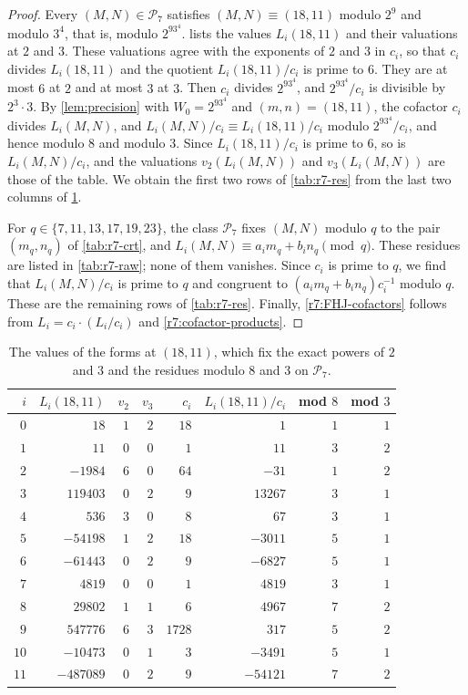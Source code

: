 \documentclass[12pt,oneside,openany]{book}
\theoremstyle{definition}
\theoremstyle{plain}
\numberwithin{equation}{chapter}
\theoremstyle{plain}
\theoremstyle{definition}
\theoremstyle{remark}
\newcommand{\cP}{\mathcal P}
\begin{document}
\begin{proof}
Every $(M,N)\in\cP_7$ satisfies $(M,N)\equiv(18,11)$ modulo $2^9$ and
modulo $3^4$, that is, modulo $2^93^4$.  lists the
values $L_i(18,11)$ and their valuations at $2$ and $3$. These valuations
agree with the exponents of $2$ and $3$ in $c_i$, so that $c_i$ divides
$L_i(18,11)$ and the quotient $L_i(18,11)/c_i$ is prime to $6$. They are at
most $6$ at $2$ and at most $3$ at $3$. Then $c_i$ divides $2^93^4$, and
$2^93^4/c_i$ is divisible by $2^3\cdot3$. By \cref{lem:precision} with
$W_0=2^93^4$ and $(m,n)=(18,11)$, the cofactor $c_i$ divides $L_i(M,N)$,
and $L_i(M,N)/c_i\equiv L_i(18,11)/c_i$ modulo $2^93^4/c_i$, and hence
modulo $8$ and modulo $3$. Since $L_i(18,11)/c_i$ is prime to $6$, so is $L_i(M,N)/c_i$, and the valuations $v_2(L_i(M,N))$ and $v_3(L_i(M,N))$ are
those of the table. We obtain the first two rows of \cref{tab:r7-res} from
the last two columns of \cref{tab:r7-anchor}.

For $q\in\{7,11,13,17,19,23\}$, the class $\cP_7$ fixes $(M,N)$ modulo $q$
to the pair $(m_q,n_q)$ of \cref{tab:r7-crt}, and
$L_i(M,N)\equiv a_im_q+b_in_q\pmod q$. These residues are listed in
\cref{tab:r7-raw}; none of them vanishes. Since $c_i$ is prime to $q$, we
find that $L_i(M,N)/c_i$ is prime to $q$ and congruent to
$(a_im_q+b_in_q)c_i^{-1}$ modulo $q$. These are the remaining rows of
\cref{tab:r7-res}. Finally, \eqref{r7:FHJ-cofactors} follows from
$L_i=c_i\cdot(L_i/c_i)$ and \eqref{r7:cofactor-products}.
\end{proof}

\begin{table}[htbp]
\centering
\caption{The values of the forms at $(18,11)$, which fix the exact powers of
$2$ and $3$ and the residues modulo $8$ and $3$ on $\cP_7$.}
\label{tab:r7-anchor}
\small
\begin{tabular}{rrrrrrrr}
\toprule
$i$ & $L_i(18,11)$ & $v_2$ & $v_3$ & $c_i$ & $L_i(18,11)/c_i$ & mod $8$ & mod $3$\\
\midrule
$0$ & $18$ & $1$ & $2$ & $18$ & $1$ & $1$ & $1$ \\
$1$ & $11$ & $0$ & $0$ & $1$ & $11$ & $3$ & $2$ \\
$2$ & $-1984$ & $6$ & $0$ & $64$ & $-31$ & $1$ & $2$ \\
$3$ & $119403$ & $0$ & $2$ & $9$ & $13267$ & $3$ & $1$ \\
$4$ & $536$ & $3$ & $0$ & $8$ & $67$ & $3$ & $1$ \\
$5$ & $-54198$ & $1$ & $2$ & $18$ & $-3011$ & $5$ & $1$ \\
$6$ & $-61443$ & $0$ & $2$ & $9$ & $-6827$ & $5$ & $1$ \\
$7$ & $4819$ & $0$ & $0$ & $1$ & $4819$ & $3$ & $1$ \\
$8$ & $29802$ & $1$ & $1$ & $6$ & $4967$ & $7$ & $2$ \\
$9$ & $547776$ & $6$ & $3$ & $1728$ & $317$ & $5$ & $2$ \\
$10$ & $-10473$ & $0$ & $1$ & $3$ & $-3491$ & $5$ & $1$ \\
$11$ & $-487089$ & $0$ & $2$ & $9$ & $-54121$ & $7$ & $2$ \\
\bottomrule
\end{tabular}
\end{table}
\end{document}
